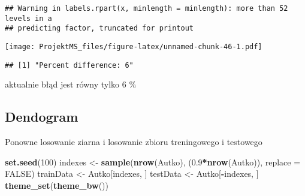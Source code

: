 \documentclass[
]{article}
\newenvironment{Shaded}{\begin{snugshade}}{\end{snugshade}}
\newcommand{\DataTypeTok}[1]{\textcolor[rgb]{0.13,0.29,0.53}{#1}}
\newcommand{\DecValTok}[1]{\textcolor[rgb]{0.00,0.00,0.81}{#1}}
\newcommand{\FloatTok}[1]{\textcolor[rgb]{0.00,0.00,0.81}{#1}}
\newcommand{\KeywordTok}[1]{\textcolor[rgb]{0.13,0.29,0.53}{\textbf{#1}}}
\newcommand{\NormalTok}[1]{#1}
\newcommand{\OperatorTok}[1]{\textcolor[rgb]{0.81,0.36,0.00}{\textbf{#1}}}
\newcommand{\OtherTok}[1]{\textcolor[rgb]{0.56,0.35,0.01}{#1}}
\newcommand{\StringTok}[1]{\textcolor[rgb]{0.31,0.60,0.02}{#1}}
\begin{document}
\begin{verbatim}
## Warning in labels.rpart(x, minlength = minlength): more than 52 levels in a
## predicting factor, truncated for printout
\end{verbatim}

\texttt{[image: ProjektMS\_files/figure-latex/unnamed-chunk-46-1.pdf]}

\begin{Shaded}
\end{Shaded}

\begin{verbatim}
## [1] "Percent difference: 6"
\end{verbatim}

aktualnie błąd jest równy tylko 6 \%

\hypertarget{dendogram}{%
\subsection{Dendogram}\label{dendogram}}

Ponowne losowanie ziarna i losowanie zbioru treningowego i testowego

\begin{Shaded}
\begin{Highlighting}[]
\KeywordTok{set.seed}\NormalTok{(}\DecValTok{100}\NormalTok{)}
\NormalTok{indexes <-}\StringTok{ }\KeywordTok{sample}\NormalTok{(}\KeywordTok{nrow}\NormalTok{(Autko), (}\FloatTok{0.9}\OperatorTok{*}\KeywordTok{nrow}\NormalTok{(Autko)), }\DataTypeTok{replace =} \OtherTok{FALSE}\NormalTok{)}
\NormalTok{trainData <-}\StringTok{ }\NormalTok{Autko[indexes, ]}
\NormalTok{testData <-}\StringTok{ }\NormalTok{Autko[}\OperatorTok{-}\NormalTok{indexes, ]}
\KeywordTok{theme_set}\NormalTok{(}\KeywordTok{theme_bw}\NormalTok{())}
\end{Highlighting}
\end{Shaded}
\end{document}
